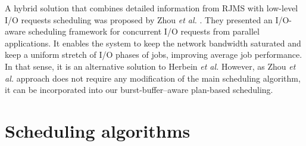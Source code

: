 \documentclass[runningheads]{llncs}
\begin{document}

A hybrid solution that combines detailed information from RJMS with low-level I/O requests scheduling was proposed by Zhou \textit{et al.} \cite{7307592}. They presented an I/O-aware scheduling framework for concurrent I/O requests from parallel applications. %
It enables the system to keep the network bandwidth saturated and keep a uniform stretch of I/O phases of jobs, improving average job performance. In that sense, it is an alternative solution to Herbein \textit{et al.} However, as Zhou \textit{et al.} approach does not require any modification of the main scheduling algorithm, it can be incorporated into our burst-buffer--aware plan-based scheduling.

\section{Scheduling algorithms} \label{sec:algorithms}
\end{document}
